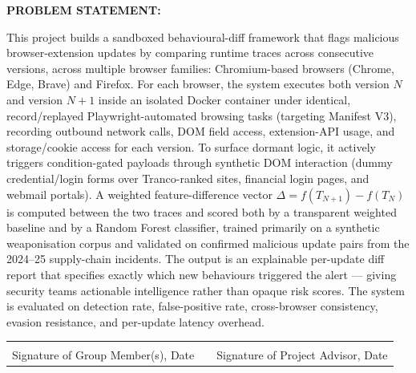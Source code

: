 \documentclass[12pt]{article}
\begin{document}
\vspace{0.5em}

\textbf{PROBLEM STATEMENT:}

This project builds a sandboxed behavioural-diff framework that flags malicious browser-extension
updates by comparing runtime traces across consecutive versions, across multiple browser families:
Chromium-based browsers (Chrome, Edge, Brave) and Firefox. For each browser, the system executes
both version $N$ and version $N{+}1$ inside an isolated Docker container under identical,
record/replayed Playwright-automated browsing tasks (targeting Manifest V3), recording outbound
network calls, DOM field access, extension-API usage, and storage/cookie access for each version.
To surface dormant logic, it actively triggers condition-gated payloads through synthetic DOM
interaction (dummy credential/login forms over Tranco-ranked sites, financial login pages, and
webmail portals). A weighted feature-difference vector $\Delta = f(T_{N+1}) - f(T_N)$ is computed
between the two traces and scored both by a transparent weighted baseline and by a Random Forest
classifier, trained primarily on a synthetic weaponisation corpus and validated on confirmed
malicious update pairs from the 2024--25 supply-chain incidents. The output is an explainable
per-update diff report that specifies exactly which new behaviours triggered the alert --- giving
security teams actionable intelligence rather than opaque risk scores. The system is evaluated on
detection rate, false-positive rate, cross-browser consistency, evasion resistance, and per-update
latency overhead.

\vfill

\noindent
\begin{tabular}{p{} p{} p{}}
\hrulefill & & \hrulefill \\[2pt]
{\footnotesize Signature of Group Member(s), Date} & &
{\footnotesize Signature of Project Advisor, Date}
\end{tabular}
\end{document}
